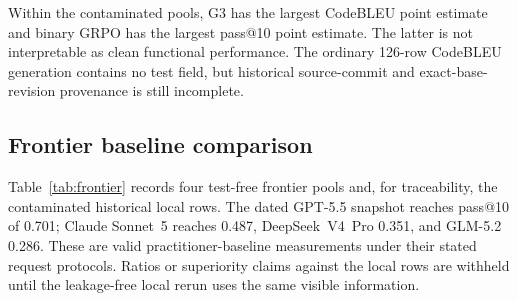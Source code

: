 \documentclass[11pt]{article}
\begin{document}
Within the contaminated pools, G3 has the largest CodeBLEU point estimate and binary GRPO has the largest pass@10 point estimate. The latter is not interpretable as clean functional performance. The ordinary 126-row CodeBLEU generation contains no test field, but historical source-commit and exact-base-revision provenance is still incomplete.

\subsection{Frontier baseline comparison}
\label{sec:frontier}

Table~\ref{tab:frontier} records four test-free frontier pools and, for traceability, the contaminated historical local rows. The dated GPT-5.5 snapshot reaches pass@10 of 0.701; Claude Sonnet~5 reaches 0.487, DeepSeek~V4~Pro 0.351, and GLM-5.2 0.286. These are valid practitioner-baseline measurements under their stated request protocols. Ratios or superiority claims against the local rows are withheld until the leakage-free local rerun uses the same visible information.

\begin{table}[t]
\centering
\small
\caption{Test-free frontier measurements and contaminated historical local diagnostics. All rows use the same JIT/pass evaluator, but only frontier prompts excluded scoring tests. The two groups are not a valid capability comparison until local reruns complete.}
\label{tab:frontier}
\end{table}
\end{document}
